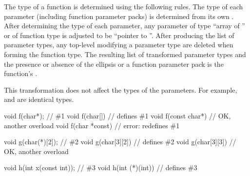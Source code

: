 \pnum
{}%
The type of a function is determined using the following rules.
The type of each parameter (including function parameter packs) is
determined from its own .
After determining the type of each parameter, any parameter
%
of type ``array of '' or
%
of function type 
is adjusted to be ``pointer to ''.
After producing the list of parameter types,
any top-level
modifying a parameter type are deleted
when forming the function type.
The resulting list of transformed parameter types
and the presence or absence of the ellipsis or a function parameter pack
is the function's
.
\begin{note}
This transformation does not affect the types of the parameters.
For example,  and
 are identical types.
\end{note}
\begin{example}
\begin{codeblock}
void f(char*);                  // \#1
void f(char[]) {}               // defines \#1
void f(const char*) {}          // OK, another overload
void f(char *const) {}          // error: redefines \#1

void g(char(*)[2]);             // \#2
void g(char[3][2]) {}           // defines \#2
void g(char[3][3]) {}           // OK, another overload

void h(int x(const int));       // \#3
void h(int (*)(int)) {}         // defines \#3
\end{codeblock}
\end{example}

